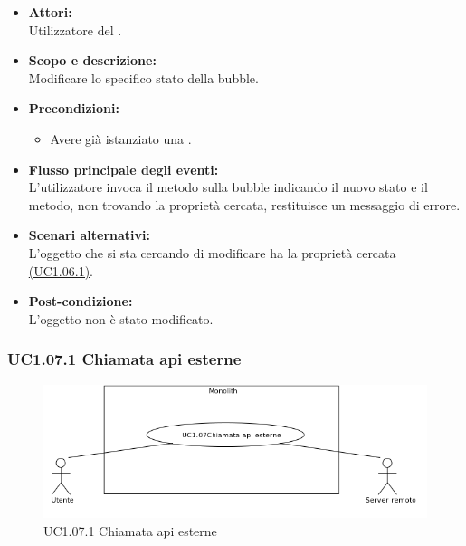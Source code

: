 \begin{itemize}
	\item \textbf{Attori:}
	\\Utilizzatore del .
	\item \textbf{Scopo e descrizione:} 
	\\Modificare lo specifico stato della bubble.
	\item \textbf{Precondizioni:}
	\begin{itemize}
		\item Avere già istanziato una .
	\end{itemize}
	\item \textbf{Flusso principale degli eventi:}
	\\L’utilizzatore invoca il metodo sulla bubble indicando il nuovo stato e il metodo, non trovando la proprietà cercata, restituisce un messaggio di errore.
	\item \textbf{Scenari alternativi:}
	\\L'oggetto che si sta cercando di modificare ha la proprietà cercata \hyperref[UC1.06.1]{(UC1.06.1)}.
	\item \textbf{Post-condizione:}
	\\L'oggetto non è stato modificato.
\end{itemize}

\subsubsection{UC1.07.1 Chiamata api esterne} \label{UC1.07.1}

\begin{figure}[H]
	\centering
	\includegraphics[width=15cm]{../../documenti/AnalisiDeiRequisiti/Diagrammi_img/uc1_07.png}
	\caption{UC1.07.1 Chiamata api esterne}
\end{figure}

